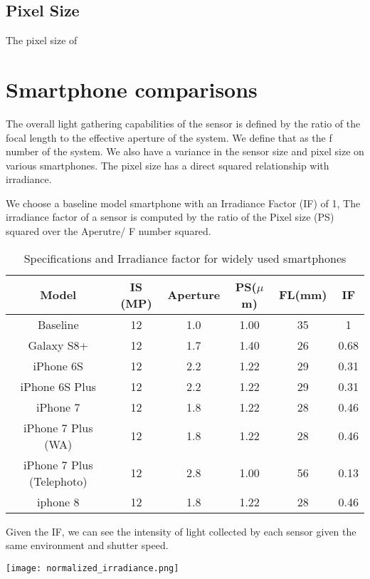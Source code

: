 \documentclass{article}
\begin{document}
\subsection{Pixel Size}

The pixel size of
\section{Smartphone comparisons}
The overall light gathering capabilities of the sensor is defined by the ratio of the focal length
to the effective aperture of the system. We define that as the f number of the system.
We also have a variance in the sensor size and pixel size on various smartphones. The
pixel size has a direct squared relationship with irradiance.

We choose a baseline model smartphone with an Irradiance Factor (IF) of 1,
The irradiance factor of a sensor is computed by the ratio of the Pixel size (PS) squared over
the Aperutre/ F number squared.

\begin{table}[h!]
\centering
\begin{tabular}{||c c c c c c||}
 \hline
 Model & IS (MP) & Aperture & PS($\mu$m) & FL(mm) & IF\\ [0.5ex]
 \hline\hline
 Baseline                  & 12 &1.0& 1.00 & 35 &1 \\
 Galaxy S8+                & 12 &1.7& 1.40 & 26 &0.68\\
 iPhone 6S                 & 12 &2.2& 1.22 & 29 &0.31\\
 iPhone 6S Plus            & 12 &2.2& 1.22 & 29 &0.31\\
 iPhone 7                  & 12 &1.8& 1.22 & 28 &0.46\\
 iPhone 7 Plus (WA)        & 12 &1.8& 1.22 & 28 &0.46\\
 iPhone 7 Plus (Telephoto) & 12 &2.8& 1.00 & 56 &0.13\\
 iphone 8                  & 12 &1.8& 1.22 & 28 &0.46\\[1ex]
 \hline
\end{tabular}
\caption{Specifications and Irradiance factor for widely used smartphones}
\label{table:1}
\end{table}

Given the IF, we can see the intensity of light collected by each sensor given the same
environment and shutter speed.

\begin{center}
  \texttt{[image: normalized\_irradiance.png]}
\end{center}
\end{document}
